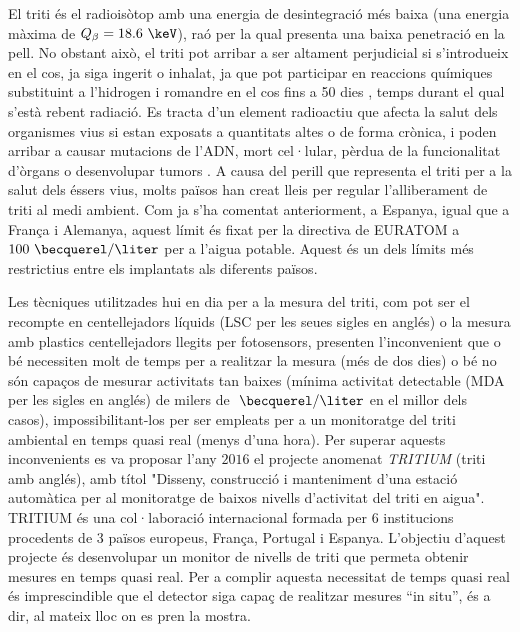 El triti és el radioisòtop amb una energia de desintegració més baixa (una energia màxima de $Q_\beta=18.6~\keV$), raó per la qual presenta una baixa penetració en la pell. No obstant això, el triti pot arribar a ser altament perjudicial si s'introdueix en el cos, ja siga ingerit o inhalat, ja que pot participar en reaccions químiques substituint a l'hidrogen i romandre en el cos fins a 50 dies \cite{EstimationTritiumDosiKangarooRats, TissueDistribution}, temps durant el qual s'està rebent radiació. Es tracta d'un element radioactiu que afecta la salut dels organismes vius si estan exposats a quantitats altes o de forma crònica, i poden arribar a causar mutacions de l'ADN, mort cel·lular, pèrdua de la funcionalitat d'òrgans o desenvolupar tumors \cite{StraumeTritiumHazard}. A causa del perill que representa el triti per a la salut dels éssers vius, molts països han creat lleis per regular l'alliberament de triti al medi ambient. Com ja s'ha comentat anteriorment, a Espanya, igual que a França i Alemanya, aquest límit és fixat per la directiva de EURATOM a $100~\becquerel/\liter$ per a l'aigua potable. Aquest és un dels límits més restrictius entre els implantats als diferents països.

Les tècniques utilitzades hui en dia per a la mesura del triti, com pot ser el recompte en centellejadors líquids (LSC per les seues sigles en anglés) o la mesura amb plastics centellejadors llegits per fotosensors, presenten l'inconvenient que o bé necessiten molt de temps per a realitzar la mesura (més de dos dies) o bé no són capaços de mesurar activitats tan baixes (mínima activitat detectable (MDA per les sigles en anglés) de milers de $~\becquerel/\liter$ en el millor dels casos), impossibilitant-los per ser empleats per a un monitoratge del triti ambiental en temps quasi real (menys d'una hora). Per superar aquests inconvenients es va proposar l'any $2016$ el projecte anomenat \textit{TRITIUM} (triti amb anglés), amb títol "Disseny, construcció i manteniment d'una estació automàtica per al monitoratge de baixos nivells d'activitat del triti en aigua". TRITIUM és una col·laboració internacional formada per $6$ institucions procedents de $3$ països europeus, França, Portugal i Espanya. L'objectiu d'aquest projecte és desenvolupar un monitor de nivells de triti que permeta obtenir mesures en temps quasi real. Per a complir aquesta necessitat de temps quasi real és imprescindible que el detector siga capaç de realitzar mesures ``in situ'', és a dir, al mateix lloc on es pren la mostra.

